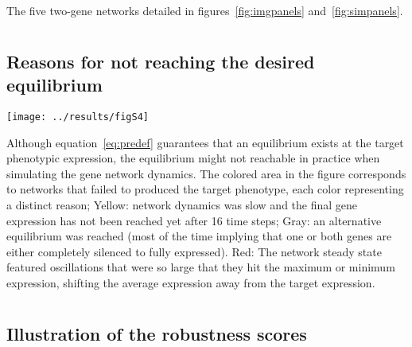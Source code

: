 \documentclass[10pt,a4paper]{article}
\begin{document}
\begin{appendices}
	{\color{Gray} The five two-gene networks detailed in figures~\ref{fig:imgpanels} and~\ref{fig:simpanels}.}

  \clearpage
  \section{}
    \label{supp:whyitfails}
    \subsection*{Reasons for not reaching the desired equilibrium}
	\begin{center}
	\texttt{[image: ../results/figS4]}
	\end{center}
	
	{\color{Gray} Although equation~\ref{eq:predef} guarantees that an equilibrium exists at the target phenotypic expression, the equilibrium might not reachable in practice when simulating the gene network dynamics. The colored area in the figure corresponds to networks that failed to produced the target phenotype, each color representing a distinct reason; Yellow: network dynamics was slow and the final gene expression has not been reached yet after 16 time steps; Gray: an alternative equilibrium was reached (most of the time implying that one or both genes are either completely silenced to fully expressed). Red: The network steady state featured oscillations that were so large that they hit the maximum or minimum expression, shifting the average expression away from the target expression. }

  \clearpage


  \clearpage
  \section{}
    \label{supp:simpanels}
    \subsection*{Illustration of the robustness scores}


\end{appendices}
\end{document}
